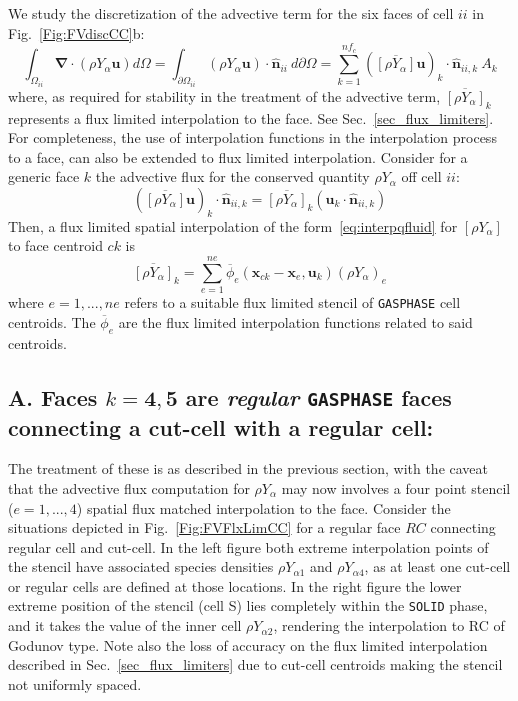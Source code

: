 We study the discretization of the advective term for the six faces of cell $ii$ in Fig.~\ref{Fig:FVdiscCC}b:
%
\begin{equation}
  \int_{\Omega_{ii}} { \boldsymbol{\nabla} \cdot  \left(  \rho Y_\alpha \mathbf{u} \right) } d \Omega =
  \int_{\partial \Omega_{ii}} { \left( \rho Y_\alpha \mathbf{u} \right) \cdot \hat{\mathbf{n}}_{ii} } \: d \partial \Omega =
  \sum^{nf_c}_{k=1} \left(  \overline{[\rho Y_\alpha]} \mathbf{u} \right)_k \cdot \hat{\mathbf{n}}_{ii,k} \: A_k \label{eq:fvadv}
\end{equation}
%
where, as required for stability in the treatment of the advective term, $\overline{[\rho Y_\alpha]}_k$ represents a flux limited interpolation to the face. See Sec.~\ref{sec_flux_limiters}. For completeness, the use of interpolation functions in the interpolation process to a face, can also be extended to flux limited interpolation. Consider for a generic face $k$ the advective flux for the conserved quantity $\rho Y_\alpha$ off cell $ii$:
%
\begin{equation}   
    \left(  \overline{[\rho Y_\alpha]} \mathbf{u} \right)_k \cdot \hat{\mathbf{n}}_{ii,k}  = \overline{[\rho Y_\alpha]}_k \left(  \mathbf{u}_k \cdot \hat{\mathbf{n}}_{ii,k} \right) 
\end{equation}
%
Then, a flux limited spatial interpolation of the form~\eqref{eq:interpqfluid} for $[\rho Y_\alpha]$ to face centroid $ck$ is
%
\begin{equation}
  \overline{[\rho Y_\alpha]}_k = \sum^{ne}_{e=1} \overline{\phi}_e(\mathbf{x}_{ck}-\mathbf{x}_e, \mathbf{u}_k) \left( \rho Y_{\alpha} \right)_e
\end{equation}
%
where $e=1,...,ne$ refers to a suitable flux limited stencil of \texttt{GASPHASE} cell centroids. The $\overline{\phi}_e$ are the flux limited interpolation functions  related to said centroids.

\subsection*{A. Faces $k=\mathbf{4},\mathbf{5}$ are \textit{regular} \texttt{GASPHASE} faces connecting a cut-cell with a regular cell:}
The treatment of these is as described in the previous section, with the caveat that the advective flux computation for $\rho Y_\alpha$ may now involves a four point stencil ($e=1,...,4$) spatial flux matched interpolation to the face. Consider the situations depicted in Fig.~\ref{Fig:FVFlxLimCC} for a regular face $RC$ connecting regular cell and cut-cell. In the left figure both extreme interpolation points of the stencil have associated species densities $\rho Y_{\alpha 1}$ and $\rho Y_{\alpha 4}$, as at least one cut-cell or regular cells are defined at those locations. In the right figure the lower extreme position of the stencil (cell S) lies completely within the \texttt{SOLID} phase, and it takes the value of the inner cell $\rho Y_{\alpha 2}$, rendering the interpolation to RC of Godunov type. Note also the loss of accuracy on the flux limited interpolation described in Sec.~\ref{sec_flux_limiters} due to cut-cell centroids making the stencil not uniformly spaced.
 
